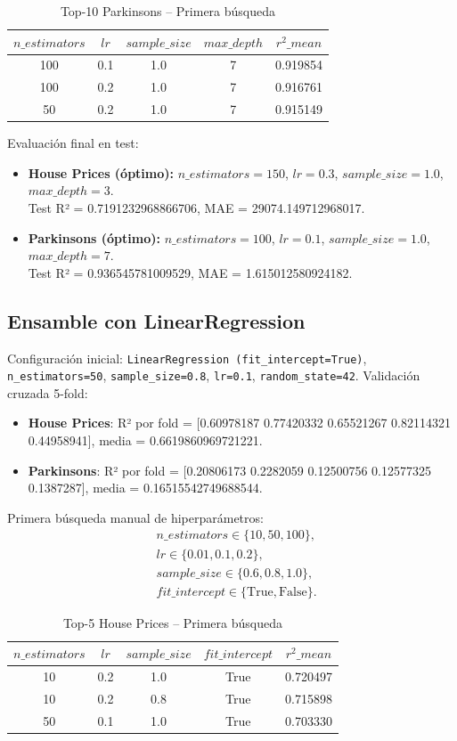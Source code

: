 \documentclass[conference,a4paper]{IEEEtran}
\begin{document}
\begin{table}[h]
\centering
\caption{Top-10 Parkinsons – Primera búsqueda}
\begin{tabular}{|c|c|c|c|c|}
\hline
$n\_estimators$ & $lr$ & $sample\_size$ & $max\_depth$ & $r^2\_mean$ \\
\hline
100 & 0.1 & 1.0 & 7 & 0.919854 \\
100 & 0.2 & 1.0 & 7 & 0.916761 \\
50 & 0.2 & 1.0 & 7 & 0.915149 \\
\hline
\end{tabular}
\end{table}


Evaluación final en test:
\begin{itemize}
    \item \textbf{House Prices (óptimo):} $n\_estimators=150$, $lr=0.3$, $sample\_size=1.0$, $max\_depth=3$. \\ Test R² = 0.7191232968866706, MAE = 29074.149712968017.
    \item \textbf{Parkinsons (óptimo):} $n\_estimators=100$, $lr=0.1$, $sample\_size=1.0$, $max\_depth=7$. \\ Test R² =  0.936545781009529, MAE = 1.615012580924182.
\end{itemize}

\subsection{Ensamble con LinearRegression}
Configuración inicial: \texttt{LinearRegression
(fit\_intercept=True)}, \texttt{n\_estimators=50}, \texttt{sample\_size=0.8}, \texttt{lr=0.1}, \texttt{random\_state=42}. Validación cruzada 5-fold:
\begin{itemize}
    \item \textbf{House Prices}: R² por fold = [0.60978187 0.77420332 0.65521267 0.82114321 0.44958941], media = 0.6619860969721221.
    \item \textbf{Parkinsons}: R² por fold = [0.20806173 0.2282059  0.12500756 0.12577325 0.1387287], media = 0.16515542749688544.
\end{itemize}

Primera búsqueda manual de hiperparámetros:
\[
\begin{aligned}
& n\_estimators \in \{10, 50, 100\}, \\
& lr \in \{0.01, 0.1, 0.2\}, \\
& sample\_size \in \{0.6, 0.8, 1.0\}, \\
& fit\_intercept \in \{\text{True}, \text{False}\}.
\end{aligned}
\]
\begin{table}[h]
\centering
\caption{Top-5 House Prices – Primera búsqueda}
\begin{tabular}{|c|c|c|c|c|}
\hline
$n\_estimators$ & $lr$ & $sample\_size$ & $fit\_intercept$ & $r^2\_mean$ \\
\hline
10 & 0.2 & 1.0 & True & 0.720497 \\
10 & 0.2 & 0.8 & True  & 0.715898 \\
50 & 0.1 & 1.0 & True & 0.703330 \\
\hline
\end{tabular}
\end{table}
\end{document}
